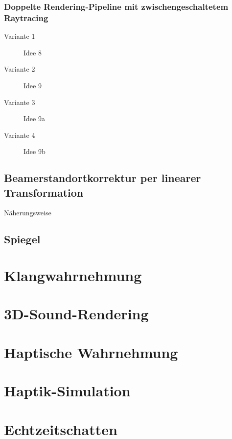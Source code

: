 \documentclass[a4paper, 12pt]{article}
\begin{document}
\subsubsection*{Doppelte Rendering-Pipeline mit zwischengeschaltetem Raytracing}
\begin{description}
  \item[Variante 1] Idee 8
  \item[Variante 2] Idee 9
  \item[Variante 3] Idee 9a
  \item[Variante 4] Idee 9b
\end{description}


\subsection{Beamerstandortkorrektur per linearer Transformation}
Näherungsweise


\subsection{Spiegel}



\section{Klangwahrnehmung}



\section{3D-Sound-Rendering}



\section{Haptische Wahrnehmung}



\section{Haptik-Simulation}



\section{Echtzeitschatten}
\end{document}
